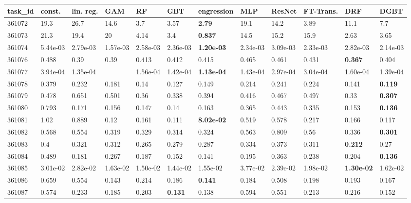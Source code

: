 \begin{table}[ht!]
\centering
\begingroup\footnotesize
\begin{tabular}{llllllllllll}
  \hline
\hline
task\_id & const. & lin. reg. & GAM & RF & GBT & engression & MLP & ResNet & FT-Trans. & DRF & DGBT \\ 
  \hline
361072 & 19.3 & 26.7 & 14.6 & 3.7 & 3.57 & \textbf{2.79} & 19.1 & 14.2 & 3.89 & 11.1 & 7.7 \\ 
  361073 & 21.3 & 19.4 & 20 & 4.14 & 3.4 & \textbf{0.837} & 14.5 & 15.2 & 15.9 & 2.63 & 3.65 \\ 
  361074 & 5.44e-03 & 2.79e-03 & 1.57e-03 & 2.58e-03 & 2.36e-03 & \textbf{1.20e-03} & 2.34e-03 & 3.09e-03 & 2.33e-03 & 2.82e-03 & 2.14e-03 \\ 
  361076 & 0.488 & 0.39 & 0.39 & 0.413 & 0.412 & 0.415 & 0.465 & 0.461 & 0.431 & \textbf{0.367} & 0.404 \\ 
  361077 & 3.94e-04 & 1.35e-04 &  & 1.56e-04 & 1.42e-04 & \textbf{1.13e-04} & 1.43e-04 & 2.97e-04 & 3.04e-04 & 1.60e-04 & 1.39e-04 \\ 
  361078 & 0.379 & 0.232 & 0.181 & 0.14 & 0.127 & 0.149 & 0.214 & 0.241 & 0.224 & 0.141 & \textbf{0.119} \\ 
  361079 & 0.478 & 0.651 & 0.501 & 0.36 & 0.338 & 0.394 & 0.416 & 0.467 & 0.497 & 0.33 & \textbf{0.307} \\ 
  361080 & 0.793 & 0.171 & 0.156 & 0.147 & 0.14 & 0.163 & 0.365 & 0.443 & 0.335 & 0.153 & \textbf{0.136} \\ 
  361081 & 1.02 & 0.889 & 0.12 & 0.161 & 0.111 & \textbf{8.02e-02} & 0.519 & 0.578 & 0.217 & 0.166 & 0.117 \\ 
  361082 & 0.568 & 0.554 & 0.319 & 0.329 & 0.314 & 0.324 & 0.563 & 0.809 & 0.56 & 0.336 & \textbf{0.301} \\ 
  361083 & 0.4 & 0.321 & 0.312 & 0.265 & 0.279 & 0.287 & 0.334 & 0.373 & 0.311 & \textbf{0.212} & 0.27 \\ 
  361084 & 0.489 & 0.181 & 0.267 & 0.187 & 0.152 & 0.141 & 0.195 & 0.363 & 0.238 & 0.204 & \textbf{0.136} \\ 
  361085 & 3.01e-02 & 2.82e-02 & 1.63e-02 & 1.50e-02 & 1.44e-02 & 1.55e-02 & 3.77e-02 & 2.39e-02 & 1.98e-02 & \textbf{1.30e-02} & 1.62e-02 \\ 
  361086 & 0.659 & 0.554 & 0.143 & 0.214 & 0.186 & \textbf{0.141} & 0.184 & 0.508 & 0.198 & 0.193 & 0.167 \\ 
  361087 & 0.574 & 0.233 & 0.185 & 0.203 & \textbf{0.131} & 0.138 & 0.594 & 0.551 & 0.213 & 0.216 & 0.152 \\ 

\end{tabular}
\end{table}
